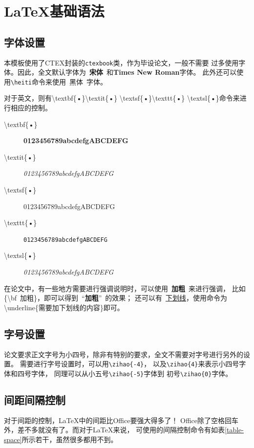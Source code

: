 \chapter{\label{chapter-basic}\LaTeX{}基础语法}
\section{字体设置}
本模板使用了CTEX封装的\texttt{ctexbook}类，作为毕设论文，一般不需要
过多使用字体。因此，全文默认字体为~{\bf 宋体}~和{\bf Times New Roman}字体。
此外还可以使用\texttt{\textbackslash heiti}命令来使用~{\heiti 黑体}~字体。

对于英文，则有\textbackslash textbf\{•\}\quad\textbackslash textit\{•\}
\quad\textbackslash textsf\{•\}\quad\textbackslash texttt\{•\}
\quad\textbackslash textsl\{•\}命令来进行相应的控制。

\begin{description}
    \item[\textbackslash textbf\{•\}] \textbf{0123456789abcdefgABCDEFG}
    \item[\textbackslash textit\{•\}] \textit{0123456789abcdefgABCDEFG}
    \item[\textbackslash textsf\{•\}] \textsf{0123456789abcdefgABCDEFG}
    \item[\textbackslash texttt\{•\}] \texttt{0123456789abcdefgABCDEFG}
    \item[\textbackslash textsl\{•\}] \textsl{0123456789abcdefgABCDEFG}
\end{description}
在论文中，有一些地方需要进行强调说明时，可以使用~{\bf 加粗}~来进行强调，
比如\{\textbackslash bf~加粗\}，即可以得到~“{\bf 加粗}”~的效果；
还可以有~\underline{下划线}，使用命令为\textbackslash underline\{需要加下划线的内容\}即可。

\section{字号设置}
论文要求正文字号为小四号，除非有特别的要求，全文不需要对字号进行另外的设置。
需要进行字号设置时，可以用\texttt{\textbackslash zihao\{-4\}}，
以及\texttt{\textbackslash zihao\{4\}}来表示小四号字体和四号字体，
同理可以从小五号\texttt{\textbackslash zihao\{-5\}}字体到
初号\texttt{\textbackslash zihao\{0\}}字体。

\section{间距间隔控制}
对于间距的控制，\LaTeX{}中的间距比Office要强大得多了！
Office除了空格回车外，差不多就没有了。而对于\LaTeX{}来说，
可使用的间隔控制命令有如表\ref{table-space}所示若干，虽然很多都用不到。

